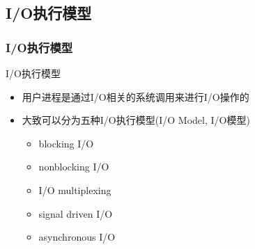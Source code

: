 \subsection{I/O执行模型} %
\begin{frame}[fragile]
    \frametitle{I/O执行模型}
    I/O执行模型
    \begin{itemize}
        \item 用户进程是通过I/O相关的系统调用来进行I/O操作的
        \item 大致可以分为五种I/O执行模型(I/O Model, I/O模型)
        \begin{itemize}
            \item blocking I/O
            \item nonblocking I/O
            \item I/O multiplexing
            \item signal driven I/O
            \item asynchronous I/O
        \end{itemize}
    \end{itemize}
\end{frame}

